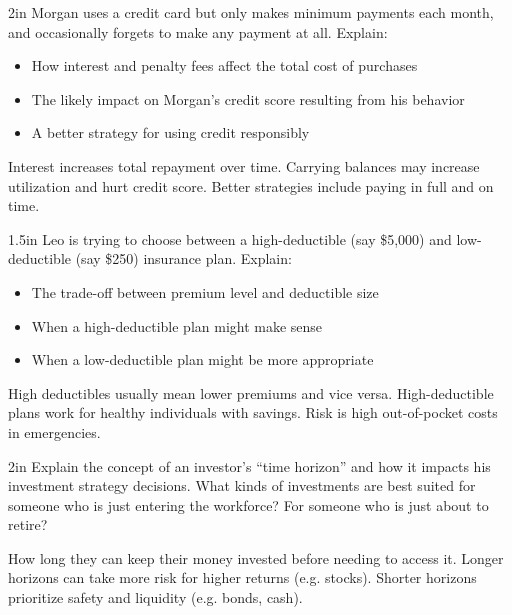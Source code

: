 \documentclass[12pt]{exam}
\begin{document}
\begin{questions}
  \begin{shortanswer}[10]{2in}
    Morgan uses a credit card but only makes minimum payments each month, and occasionally
    forgets to make any payment at all. Explain:
    \begin{itemize}
      \item How interest and penalty fees affect the total cost of purchases
      \item The likely impact on Morgan’s credit score resulting from his behavior
      \item A better strategy for using credit responsibly
    \end{itemize}
  \end{shortanswer}
  \begin{solution}
    Interest increases total repayment over time. Carrying balances may increase utilization and hurt credit score. Better strategies include paying in full and on time.
  \end{solution}

  \begin{shortanswer}[10]{1.5in}
    Leo is trying to choose between a high-deductible (say \$5,000) and low-deductible
    (say \$250) insurance plan.  Explain:
    \begin{itemize}
      \item The trade-off between premium level and deductible size
      \item When a high-deductible plan might make sense
      \item When a low-deductible plan might be more appropriate
    \end{itemize}
  \end{shortanswer}
  \begin{solution}
    High deductibles usually mean lower premiums and vice versa.
    High-deductible plans work for healthy individuals with savings.
    Risk is high out-of-pocket costs in
    emergencies.
  \end{solution}

  \begin{shortanswer}[10]{2in}
    Explain the concept of an investor's ``time horizon'' and how it impacts his investment
    strategy decisions.  What kinds of investments are best suited for someone who is just
    entering the workforce?  For someone who is just about to retire?
  \end{shortanswer}
  \begin{solution}
    How long they can keep their money invested before needing to access it.  Longer horizons can
    take more risk for higher returns (e.g. stocks).  Shorter horizons prioritize safety and
    liquidity (e.g. bonds, cash).
  \end{solution}


\end{questions}
\end{document}
